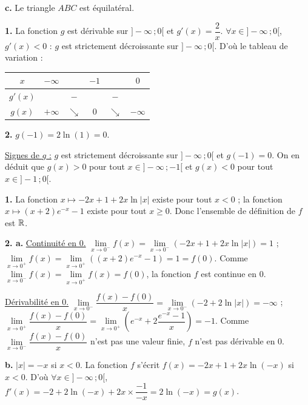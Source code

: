 \documentclass[11pt]{article}
\begin{document}
\textbf{c.} Le triangle $ABC$ est équilatéral.

\prob{}

\textbf{1.} La fonction $g$ est dérivable sur $]-\infty\,;0[$ et $g'(x) = \dfrac{2}{x}$. $\forall x \in ]-\infty\,;0[$, $g'(x) < 0$ : $g$ est strictement décroissante sur $]-\infty\,;0[$. D'où le tableau de variation :
\begin{center}\renewcommand{\arraystretch}{1.4}
\begin{tabular}{|c|ccccc|}
\hline
$x$ & $-\infty$ & & $-1$ & & $0$ \\
\hline
$g'(x)$ & & $-$ & & $-$ & \\
\hline
$g(x)$ & $+\infty$ & $\searrow$ & $0$ & $\searrow$ & $-\infty$ \\
\hline
\end{tabular}
\end{center}

\textbf{2.} $g(-1) = 2\ln(1) = 0$.

\underline{Signes de $g$ :} $g$ est strictement décroissante sur $]-\infty\,;0[$ et $g(-1) = 0$. On en déduit que $g(x) > 0$ pour tout $x \in ]-\infty\,;-1[$ et $g(x) < 0$ pour tout $x \in ]-1\,;0[$.

\textbf{1.} La fonction $x \mapsto -2x + 1 + 2x\ln|x|$ existe pour tout $x < 0$ ; la fonction $x \mapsto (x + 2)e^{-x} - 1$ existe pour tout $x \ge 0$. Donc l'ensemble de définition de $f$ est $\mathbb{R}$.

\textbf{2. a.} \underline{Continuité en 0.} $\lim\limits_{x\to 0^-} f(x) = \lim\limits_{x\to 0^-}(-2x + 1 + 2x\ln|x|) = 1$ ; $\lim\limits_{x\to 0^+} f(x) = \lim\limits_{x\to 0^+}((x+2)e^{-x} - 1) = 1 = f(0)$. Comme $\lim\limits_{x\to 0^-} f(x) = \lim\limits_{x\to 0^+} f(x) = f(0)$, la fonction $f$ est continue en 0.

\underline{Dérivabilité en 0.} $\lim\limits_{x\to 0^-}\dfrac{f(x) - f(0)}{x} = \lim\limits_{x\to 0^-}(-2 + 2\ln|x|) = -\infty$ ; $\lim\limits_{x\to 0^+}\dfrac{f(x) - f(0)}{x} = \lim\limits_{x\to 0^+}\left(e^{-x} + 2\dfrac{e^{-x} - 1}{x}\right) = -1$. Comme $\lim\limits_{x\to 0^-}\dfrac{f(x) - f(0)}{x}$ n'est pas une valeur finie, $f$ n'est pas dérivable en 0.

\textbf{b.} $|x| = -x$ si $x < 0$. La fonction $f$ s'écrit $f(x) = -2x + 1 + 2x\ln(-x)$ si $x < 0$. D'où $\forall x \in ]-\infty\,;0[$, $f'(x) = -2 + 2\ln(-x) + 2x \times \dfrac{-1}{-x} = 2\ln(-x) = g(x)$.
\end{document}

